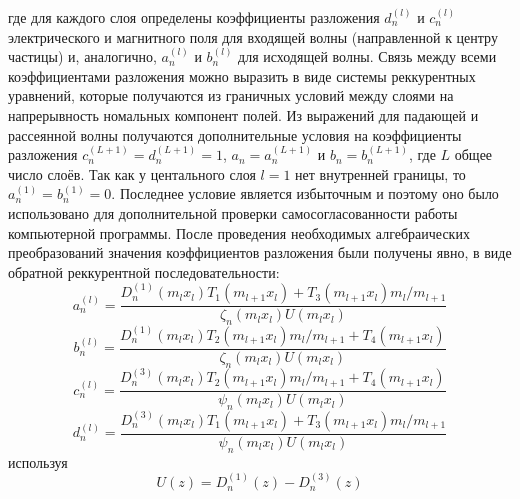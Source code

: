 где для каждого слоя определены коэффициенты разложения $d_n^{(l)}$ и
$c_n^{(l)}$ электрического и магнитного поля для входящей волны
(направленной к центру частицы) и, аналогично, $a_n^{(l)}$ и
$b_n^{(l)}$ для исходящей волны.  Связь между всеми коэффициентами
разложения можно выразить в виде системы реккурентных уравнений,
которые получаются из граничных условий между слоями на напрерывность
номальных компонент полей.  Из выражений для падающей
и рассеянной волны получаются дополнительные условия на коэффициенты
разложения $c_n^{(L+1)}=d_n^{(L+1)}=1$, $a_n=a_n^{(L+1)}$ и
$b_n=b_n^{(L+1)}$, где $L$ общее число слоёв. Так как у центального
слоя $l=1$ нет внутренней границы, то
$a_n^{(1)}=b_n^{(1)}=0$. Последнее условие является избыточным и
поэтому оно было использовано для дополнительной проверки
самосогласованности работы компьютерной программы.  После проведения
необходимых алгебраических преобразований значения коэффициентов
разложения были получены явно, в виде обратной реккурентной
последовательности:
\begin{equation}
\label{eq:6p1}
a^{(l)}_n = \frac
{
    {D^{(1)}_{n}}{\left (m_{l} x_{l} \right )}
    T_1\left (m_{l+1} x_{l} \right )
    +
    T_3\left (m_{l+1} x_{l} \right )
    m_{l}/m_{l+1}
}
{
   \zeta_{n}\left (m_{l} x_{l} \right )
   U\left (m_{l} x_{l} \right )
}
\end{equation}
\begin{equation}
\label{eq:6p2}
b^{(l)}_n = \frac
{
    {D^{(1)}_{n}}{\left (m_{l} x_{l} \right )}
    T_2\left (m_{l+1} x_{l} \right )
    m_{l}/m_{l+1}
    +
    T_4\left (m_{l+1} x_{l} \right )
}
{
   \zeta_{n}\left (m_{l} x_{l} \right )
   U\left (m_{l} x_{l} \right )
}
\end{equation}
\begin{equation}
\label{eq:6p3}
c^{(l)}_n = \frac
{
    {D^{(3)}_{n}}{\left (m_{l} x_{l} \right )}
    T_2\left (m_{l+1} x_{l} \right )
    m_{l}/m_{l+1}
    +
    T_4\left (m_{l+1} x_{l} \right )
}
{
   \psi_{n}\left (m_{l} x_{l} \right )
   U\left (m_{l} x_{l} \right )
}
\end{equation}
\begin{equation}
\label{eq:6p4}
d^{(l)}_n = \frac
{
    {D^{(3)}_{n}}{\left (m_{l} x_{l} \right )}
    T_1\left (m_{l+1} x_{l} \right )
    +
    T_3\left (m_{l+1} x_{l} \right )
    m_{l}/m_{l+1}
}
{
   \psi_{n}\left (m_{l} x_{l} \right )
   U\left (m_{l} x_{l} \right )
}
\end{equation}
используя
\begin{equation*}
  U(z) =    {D^{(1)}_{n}}(z) - {D^{(3)}_{n}}(z)
\end{equation*}
